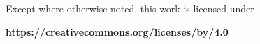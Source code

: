 \documentclass{beamer}
\begin{document}
\begin{frame}[c]
    \begin{columns}[c]
        \begin{column}[c]{5cm}
        \end{column}
        \begin{column}[c]{5cm}
        \end{column}
    \end{columns}

    \begin{columns}[c]
        \begin{column}[c]{5cm}
            \centerline{Except where otherwise noted, this work is licensed under}
            \centerline{\textbf{https://creativecommons.org/licenses/by/4.0}}
        \end{column}
    \end{columns}
\end{frame}
\end{document}
